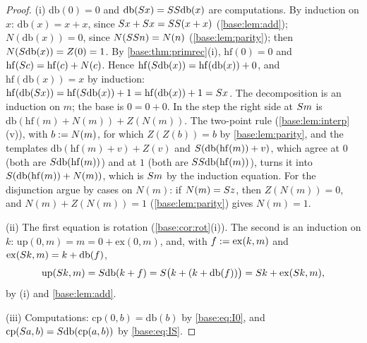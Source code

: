\begin{proof}
(i) $\mathrm{db}(0)=0$ and $\mathrm{db}(S x)=SS\mathrm{db}(x)$ are
computations.  By induction on $x$: $\mathrm{db}(x)=x+x$, since
$S x+S x=SS(x+x)$ (\cref{base:lem:add}); $N(\mathrm{db}(x))=0$,
since $N(SS n)=N(n)$ (\cref{base:lem:parity}); then
$N(S\mathrm{db}(x))=Z(0)=1$.  By \cref{base:thm:primrec}(i),
$\mathrm{hf}(0)=0$ and $\mathrm{hf}(S c)=\mathrm{hf}(c)+N(c)$.  Hence
$\mathrm{hf}(S\mathrm{db}(x))=\mathrm{hf}(\mathrm{db}(x))+0$, and
$\mathrm{hf}(\mathrm{db}(x))=x$ by induction:
$\mathrm{hf}(\mathrm{db}(S x))=\mathrm{hf}(S\mathrm{db}(x))+1
=\mathrm{hf}(\mathrm{db}(x))+1=S x$.  The decomposition is an
induction on $m$; the base is $0=0+0$.  In the step the right side at
$S m$ is $\mathrm{db}(\mathrm{hf}(m)+N(m))+Z(N(m))$.  The two-point rule
(\cref{base:lem:interp}(v)), with $b\mathrel{:=} N(m)$, for which
$Z(Z(b))=b$ by \cref{base:lem:parity}, and the templates
$\mathrm{db}(\mathrm{hf}(m)+v)+Z(v)$ and $S(\mathrm{db}(\mathrm{hf}(m))+v)$,
which agree at $0$ (both are $S\mathrm{db}(\mathrm{hf}(m))$) and at $1$
(both are $SS\mathrm{db}(\mathrm{hf}(m))$), turns it into
$S(\mathrm{db}(\mathrm{hf}(m))+N(m))$, which is $S m$ by the
induction equation.  For the disjunction argue by cases on $N(m)$: if
$N(m)=S z$, then $Z(N(m))=0$, and $N(m)+Z(N(m))=1$
(\cref{base:lem:parity}) gives $N(m)=1$.

(ii) The first equation is rotation (\cref{base:cor:rot}(i)).  The second
is an induction on $k$: $\mathrm{up}(0,m)=m=0+\mathrm{ex}(0,m)$, and, with
$f\mathrel{:=}\mathrm{ex}(k,m)$ and $\mathrm{ex}(S k,m)=k+\mathrm{db}(f)$,
\[
 \mathrm{up}(S k,m)=S\mathrm{db}(k+f)=S\bigl(k+(k+\mathrm{db}(f))\bigr)
 =S k+\mathrm{ex}(S k,m),
\]
by (i) and \cref{base:lem:add}.

(iii) Computations: $\mathrm{cp}(0,b)=\mathrm{db}(b)$ by
\eqref{base:eq:I0}, and $\mathrm{cp}(S a,b)=S\mathrm{db}(\mathrm{cp}(a,b))$
by \eqref{base:eq:IS}.


\end{proof}
